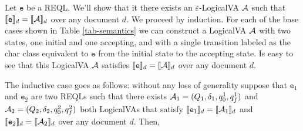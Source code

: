 Let $\texttt{e}$ be a REQL. We'll show that it there exists an
$\varepsilon$-LogicalVA $\mathcal{A}$ such that $\llbracket\texttt{e}\rrbracket_d = \llbracket\mathcal{A}\rrbracket_d$ over
any document $d$.  We proceed by induction. For each of the base cases shown in
Table \ref*{tab-semantics} we can construct a LogicalVA $\mathcal{A}$ with two states,
one initial and one accepting, and with a single transition labeled as the char
class equivalent to $\texttt{e}$ from the initial state to the accepting state.
Is easy to see that this LogicalVA $\mathcal{A}$ satisfies $\llbracket\texttt{e}\rrbracket_d =
\llbracket\mathcal{A}\rrbracket_d$ over any document $d$.

The inductive case goes as follows: without any loss of generality suppose that
$\texttt{e}_1$ and $\texttt{e}_2$ are two REQLs such that there exists $\mathcal{A}_1 =
(Q_1, \delta_1, q_0^1, q_f^1)$ and $\mathcal{A}_2 = (Q_2, \delta_2, q_0^2, q_f^2)$ both
LogicalVAs that satisfy $\llbracket\texttt{e}_1\rrbracket_d = \llbracket\mathcal{A}_1\rrbracket_d$ and
$\llbracket\texttt{e}_2\rrbracket_d = \llbracket\mathcal{A}_2\rrbracket_d$ over any document $d$. Then,


